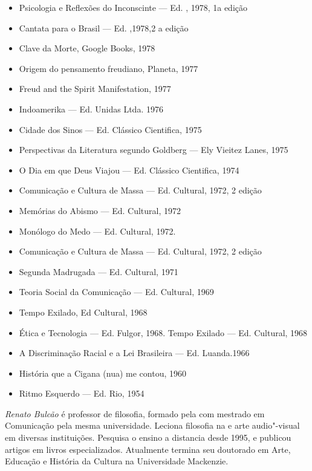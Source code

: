 \begin{itemize}
\item
  Psicologia e Reflexões do Inconscinte --- Ed. , 1978, 1a edição
\item
  Cantata para o Brasil --- Ed. ,1978,2 a edição
\item
  Clave da Morte, Google Books, 1978
\item
  Origem do pensamento freudiano, Planeta, 1977
\item
  Freud and the Spirit Manifestation, 1977
\item
  Indoamerika --- Ed. Unidas Ltda. 1976
\item
  Cidade dos Sinos --- Ed. Clássico Cientifica, 1975
\item
  Perspectivas da Literatura segundo Goldberg --- Ely Vieitez Lanes,
  1975
\item
  O Dia em que Deus Viajou --- Ed. Clássico Cientifica, 1974
\item
  Comunicação e Cultura de Massa --- Ed. Cultural, 1972, 2 edição
\item
  Memórias do Abismo --- Ed. Cultural, 1972
\item
  Monólogo do Medo --- Ed. Cultural, 1972.
\item
  Comunicação e Cultura de Massa --- Ed. Cultural, 1972, 2 edição
\item
  Segunda Madrugada --- Ed. Cultural, 1971
\item
  Teoria Social da Comunicação --- Ed. Cultural, 1969
\item
  Tempo Exilado, Ed Cultural, 1968
\item
  Ética e Tecnologia --- Ed. Fulgor, 1968. Tempo Exilado --- Ed.
  Cultural, 1968
\item
  A Discriminação Racial e a Lei Brasileira --- Ed. Luanda.1966
\item
  História que a Cigana (nua) me contou, 1960
\item
  Ritmo Esquerdo --- Ed. Rio, 1954
\end{itemize}

 

\emph{Renato Bulcão} é professor de filosofia, formado pela  com
mestrado em Comunicação pela mesma universidade. Leciona filosofia na
 e arte audio"-visual em diversas instituições. Pesquisa o ensino a
distancia desde 1995, e publicou artigos em livros especializados.
Atualmente termina seu doutorado em Arte, Educação e História da Cultura
na Universidade Mackenzie.
